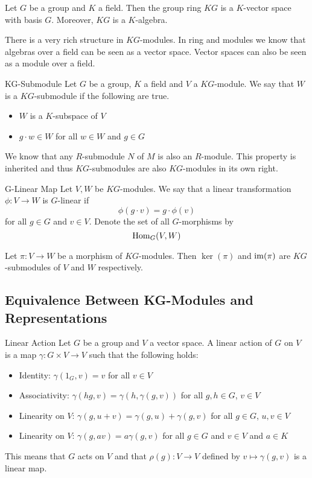 \documentclass[a4paper]{article}
\begin{document}
\begin{lmm}{}{} Let $G$ be a group and $K$ a field. Then the group ring $KG$ is a $K$-vector space with basis $G$. Moreover, $KG$ is a $K$-algebra. 
\end{lmm}

There is a very rich structure in $KG$-modules. In ring and modules we know that algebras over a field can be seen as a vector space. Vector spaces can also be seen as a module over a field. 
\begin{defn}{KG-Submodule}{} Let $G$ be a group, $K$ a field and $V$ a $KG$-module. We say that $W$ is a $KG$-submodule if the following are true. 
\begin{itemize}
\item $W$ is a $K$-subspace of $V$
\item $g\cdot w\in W$ for all $w\in W$ and $g\in G$
\end{itemize}
\end{defn}

We know that any $R$-submodule $N$ of $M$ is also an $R$-module. This property is inherited and thus $KG$-submodules are also $KG$-modules in its own right. 

\begin{defn}{G-Linear Map}{} Let $V,W$ be $KG$-modules. We say that a linear transformation $\phi:V\to W$ is $G$-linear if $$\phi(g\cdot v)=g\cdot\phi(v)$$ for all $g\in G$ and $v\in V$. Denote the set of all $G$-morphisms by $$\operatorname{Hom}_G(V,W)$$
\end{defn}

\begin{lmm}{}{} Let $\pi:V\to W$ be a morphism of $KG$-modules. Then $\ker(\pi)$ and $\operatorname{im}(\pi)$ are $KG$-submodules of $V$ and $W$ respectively. 
\end{lmm}

\subsection{Equivalence Between KG-Modules and Representations}
\begin{defn}{Linear Action}{} Let $G$ be a group and $V$ a vector space. A linear action of $G$ on $V$ is a map $\gamma:G\times V\to V$ such that the following holds: 
\begin{itemize}
\item Identity: $\gamma(1_G,v)=v$ for all $v\in V$
\item Associativity: $\gamma(hg,v)=\gamma(h,\gamma(g,v))$ for all $g,h\in G$, $v\in V$
\item Linearity on $V$: $\gamma(g,u+v)=\gamma(g,u)+\gamma(g,v)$ for all $g\in G$, $u,v\in V$
\item Linearity on $V$: $\gamma(g,av)=a\gamma(g,v)$ for all $g\in G$ and $v\in V$ and $a\in K$
\end{itemize}
This means that $G$ acts on $V$ and that $\rho(g):V\to V$ defined by $v\mapsto\gamma(g,v)$ is a linear map. 
\end{defn}
\end{document}
